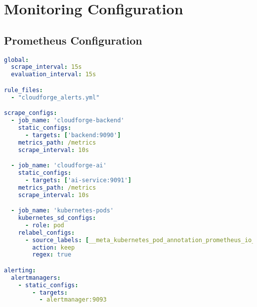 \section{Monitoring Configuration}

\subsection{Prometheus Configuration}

\begin{lstlisting}[language=yaml]
global:
  scrape_interval: 15s
  evaluation_interval: 15s

rule_files:
  - "cloudforge_alerts.yml"

scrape_configs:
  - job_name: 'cloudforge-backend'
    static_configs:
      - targets: ['backend:9090']
    metrics_path: /metrics
    scrape_interval: 10s

  - job_name: 'cloudforge-ai'
    static_configs:
      - targets: ['ai-service:9091']
    metrics_path: /metrics
    scrape_interval: 10s

  - job_name: 'kubernetes-pods'
    kubernetes_sd_configs:
      - role: pod
    relabel_configs:
      - source_labels: [__meta_kubernetes_pod_annotation_prometheus_io_scrape]
        action: keep
        regex: true

alerting:
  alertmanagers:
    - static_configs:
        - targets:
          - alertmanager:9093
\end{lstlisting}